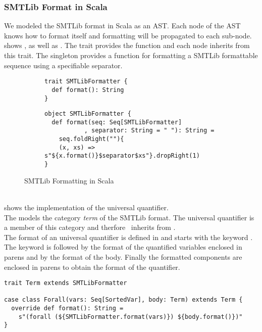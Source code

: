 \subsubsection{SMTLib Format in Scala}
%
\lstset{ language=scala,basicstyle=\small }
%
We modeled the SMTLib format in Scala as an AST.
Each node of the AST knows how to format itself
and formatting will be propagated to each sub-node.\\
 shows 
, as well as
.
The trait provides the function 
and each node inherits from this trait.
The singleton 
provides a function for formatting a SMTLib formattable
sequence using a specifiable separator.
%
\begin{figure}[h]
\begin{subfigure}[c]{1\textwidth}
\begin{lstlisting}
trait SMTLibFormatter {
  def format(): String
}
\end{lstlisting}
\end{subfigure}
\begin{subfigure}[c]{1\textwidth}
\begin{lstlisting}
object SMTLibFormatter {
  def format(seq: Seq[SMTLibFormatter]
           , separator: String = " "): String =
    seq.foldRight(""){
    (x, xs) => s"${x.format()}$separator$xs"}.dropRight(1)
}
\end{lstlisting}
\end{subfigure}
\caption{SMTLib Formatting in Scala}
\label{fig:scala-format}
\end{figure}\\
%
 shows the implementation
of the universal quantifier.\\
The  models the category \textit{term}
of the SMTLib format.
The universal quantifier is a member of this category
and therfore \ inherits from .\\
The format of an universal quantifier is defined
in  and starts
with the keyword .
The keyword is followed by the format of the quantified variables
enclosed in parens and by the format of the body.
Finally the formatted components are enclosed in parens
to obtain the format of the quantifier.
%
\begin{example}
\label{ex:scala-format}
\begin{lstlisting}
trait Term extends SMTLibFormatter

case class Forall(vars: Seq[SortedVar], body: Term) extends Term {
  override def format(): String =
    s"(forall (${SMTLibFormatter.format(vars)}) ${body.format()})"
}
\end{lstlisting}
\end{example}

